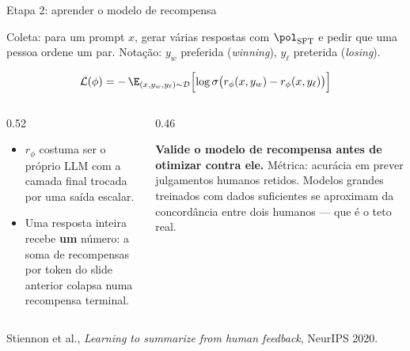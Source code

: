 \documentclass[aspectratio=169, 11pt]{beamer}
\newcommand{\psft}{\pol_{\mathrm{SFT}}}          %
\newcommand{\rphi}{r_{\phi}}                     %
\newcommand{\Dset}{\mathcal{D}}
\newcommand{\yw}{y_{w}}                          %
\newcommand{\yl}{y_{\ell}}                       %
\newcommand{\sig}{\sigma}
\begin{document}
\begin{frame}{Etapa 2: aprender o modelo de recompensa}

  Coleta: para um prompt $x$, gerar várias respostas com $\psft$ e pedir que uma
  pessoa ordene um par. Notação: $\yw$ preferida (\emph{winning}), $\yl$
  preterida (\emph{losing}).

  \[
    \mathcal{L}(\phi) = -\,\E_{(x,\yw,\yl)\sim\Dset}
      \Bigl[\log \sig\bigl(\rphi(x,\yw) - \rphi(x,\yl)\bigr)\Bigr]
  \]

  \begin{columns}[T]
  \begin{column}{0.52\textwidth}
    \begin{itemize}\setlength{\itemsep}{0.2ex}
      \item $\rphi$ costuma ser o próprio LLM com a camada final trocada por uma
        saída escalar.
      \item Uma resposta inteira recebe \textbf{um} número: a soma de recompensas
        por token do slide anterior colapsa numa recompensa terminal.
    \end{itemize}
  \end{column}
  \begin{column}{0.46\textwidth}
    \begin{ideiabox}
      \textbf{Valide o modelo de recompensa antes de otimizar contra ele.}
      Métrica: acurácia em prever julgamentos humanos retidos. Modelos grandes
      treinados com dados suficientes se aproximam da concordância entre dois
      humanos --- que é o teto real.
    \end{ideiabox}
  \end{column}
  \end{columns}

  {\scriptsize\color{rlCinza}Stiennon et al., \emph{Learning to summarize from
  human feedback}, NeurIPS 2020.}
\end{frame}
\end{document}
